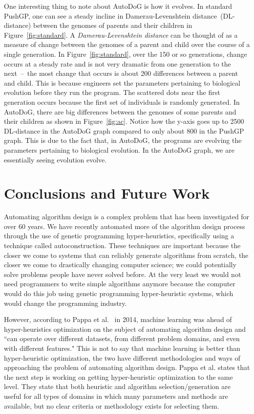 \documentclass{sig-alternate}
\begin{document}
One interesting thing to note about AutoDoG is how it evolves. In standard PushGP, one can see a steady incline in Damerau-Levenshtein distance~(DL-distance) between the genomes of parents and their children in Figure~\ref{fig:standard}. A \textit{Damerau-Levenshtein distance} can be thought of as a measure of change between the genomes of a parent and child over the course of a single generation. In Figure~\ref{fig:standard}, over the 150 or so generations, change occurs at a steady rate and is not very dramatic from one generation to the next~--~the most change that occurs is about 200 differences between a parent and child. This is because engineers set the parameters pertaining to biological evolution before they run the program. The scattered dots near the first generation occurs because the first set of individuals is randomly generated. In AutoDoG, there are big differences between the genomes of some parents and their children as shown in Figure~\ref{fig:ac}. Notice how the y-axis goes up to 2500 DL-distance in the AutoDoG graph compared to only about 800 in the PushGP graph. This is due to the fact that, in AutoDoG, the programs are evolving the parameters pertaining to biological evolution. In the AutoDoG graph, we are essentially seeing evolution evolve.

\section{Conclusions and Future Work}
\label{sec:conclusion}
Automating algorithm design is a complex problem that has been investigated for over 60 years. We have recently automated more of the algorithm design process through the use of genetic programming hyper-heuristics, specifically using a technique called autoconstruction. These techniques are important because the closer we come to systems that can reliably generate algorithms from scratch, the closer we come to drastically changing computer science; we could potentially solve problems people have never solved before. At the very least we would not need programmers to write simple algorithms anymore because the computer would do this job using genetic programming hyper-heuristic systems, which would change the programming industry.

However, according to Pappa et al.~\cite{pappa:2014} in 2014, machine learning was ahead of hyper-heuristics optimization on the subject of automating algorithm design and ``can operate over different datasets, from different problem domains, and even with different features." This is not to say that machine learning is better than hyper-heuristic optimization, the two have different methodologies and ways of approaching the problem of automating algorithm design. Pappa et al. states that the next step is working on getting hyper-heuristic optimization to the same level. They state that both heuristic and algorithm selection/generation are useful for all types of domains in which many parameters and methods are available, but no clear criteria or methodology exists for selecting them.
\end{document}
